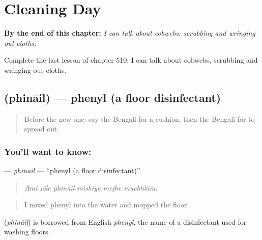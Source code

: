 
\chapter{Cleaning Day}
\label{ch:bn-cleaning-day}

\begin{chapteropening}
\textbf{By the end of this chapter:} \emph{I can talk about cobwebs, scrubbing and wringing out cloths.}

Complete the last lesson of chapter 510: I can talk about cobwebs, scrubbing and wringing out cloths.
\end{chapteropening}

\section[\texorpdfstring{\bn{ফিনাইল} (phināil)}{ফিনাইল (phināil)}]{ (phināil) — phenyl (a floor disinfectant)}

\label{lesson:BN-C510-phinail}



\begin{quote}
Before the new one: say the Bengali for a cushion, then the Bengali for to spread out.
\end{quote}

\subsection*{You'll want to know: }
\textbf{} — \emph{phināil} — \textquotedblleft{}phenyl (a floor disinfectant)\textquotedblright{}.

\begin{quote}
     
\end{quote}

\begin{quote}
\emph{Āmi jôle phināil mishiye mejhe muchhlām.}
\end{quote}

\begin{quote}
I mixed phenyl into the water and mopped the floor.
\end{quote}

\begin{cousinweb}
\textbf{} (\emph{phināil}) is borrowed from English \emph{phenyl}, the name of a disinfectant used for washing floors.
\end{cousinweb}

